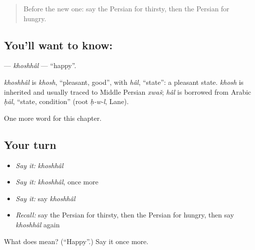 \begin{quote}
Before the new one: say the Persian for thirsty, then the Persian for hungry.
\end{quote}

\subsection*{You'll want to know: }
\textbf{} — \emph{khoshhâl} — \textquotedblleft{}happy\textquotedblright{}.

\begin{cousinweb}
\emph{khoshhâl} is \emph{khosh}, \textquotedblleft{}pleasant, good\textquotedblright{}, with \emph{hâl}, \textquotedblleft{}state\textquotedblright{}: a pleasant state. \emph{khosh} is inherited and usually traced to Middle Persian \emph{xwaš}; \emph{hâl} is borrowed from Arabic \emph{ḥāl}, \textquotedblleft{}state, condition\textquotedblright{} (root \emph{ḥ-w-l}, Lane).
\end{cousinweb}

\begin{grammarlens}[title={What you've built}]
One more word for this chapter.
\end{grammarlens}

\subsection*{Your turn}
\begin{itemize}
\raggedright
  \item \emph{Say it:} \emph{khoshhâl}
  \item \emph{Say it:} \emph{khoshhâl}, once more
  \item \emph{Say it:} say \emph{khoshhâl}
  \item \emph{Recall:} say the Persian for thirsty, then the Persian for hungry, then say \emph{khoshhâl} again
\end{itemize}

\begin{tcolorbox}[breakable,colback=teal!4,colframe=teal!35!black,title={Before you move on}]
What does  mean? (\textquotedblleft{}Happy\textquotedblright{}.) Say it once more.
\end{tcolorbox}

